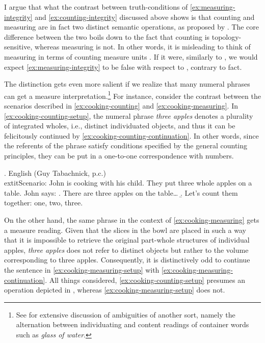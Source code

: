 I argue that what the contrast between truth-conditions of \ref{ex:measuring-integrity} and \ref{ex:counting-integrity} discussed above shows is that counting and measuring are in fact two distinct semantic operations, as proposed by \citet{rothstein2017semantics}. The core difference between the two boils down to the fact that counting is topology-sensitive, whereas measuring is not. In other words, it is misleading to think of measuring in terms of counting measure units \citep[pace][]{gil2013numeral}. If it were, similarly to , we would expect \ref{ex:measuring-integrity} to be false with respect to , contrary to fact. 

The distinction gets even more salient if we realize that many numeral phrases can get a measure interpretation.\footnote{See \citet[p. 3]{rothstein2017semantics} for extensive discussion of ambiguities of another sort, namely the alternation between individuating and content readings of container words such as \textit{glass of water}.} For instance, consider the contrast between the scenarios described in \ref{ex:cooking-counting} and \ref{ex:cooking-measuring}. In \ref{ex:cooking-counting-setup}, the numeral phrase \textit{three apples} denotes a plurality of integrated wholes, i.e., distinct individuated objects, and thus it can be felicitously continued by \ref{ex:cooking-counting-continuation}. In other words, since the referents of the phrase satisfy conditions specified by the general counting principles, they can be put in a one-to-one correspondence with numbers.  

\ex. English (Guy Tabachnick, p.c.)\\
	extit{Scenario}: John is cooking with his child. They put three whole apples on a table. John says:\label{ex:cooking-counting}
\a. There are three apples on the table\dots\label{ex:cooking-counting-setup}
\b. Let's count them together: one, two, three.\label{ex:cooking-counting-continuation}

On the other hand, the same phrase in the context of \ref{ex:cooking-measuring} gets a measure reading. Given that the slices in the bowl are placed in such a way that it is impossible to retrieve the original part-whole structures of individual apples, \textit{three apples} does not refer to distinct objects but rather to the volume corresponding to three apples. Consequently, it is distinctively odd to continue the sentence in \ref{ex:cooking-measuring-setup} with \ref{ex:cooking-measuring-continuation}. All things considered, \ref{ex:cooking-counting-setup} presumes an operation depicted in , whereas \ref{ex:cooking-measuring-setup} does not.

